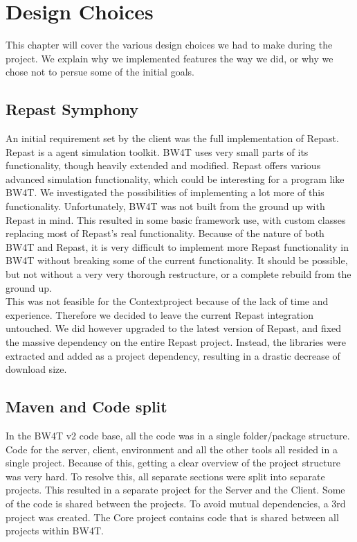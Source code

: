 \label{Design}
\chapter{Design Choices}
This chapter will cover the various design choices we had to make during the project. We explain why we implemented features the way we did, or why we chose not to persue some of the initial goals. 

\section{Repast Symphony}
An initial requirement set by the client was the full implementation of Repast. Repast is a agent simulation toolkit. BW4T uses very small parts of its functionality, though heavily extended and modified. Repast offers various advanced simulation functionality, which could be interesting for a program like BW4T. We investigated the possibilities of implementing a lot more of this functionality. Unfortunately, BW4T was not built from the ground up with Repast in mind. This resulted in some basic framework use, with custom classes replacing most of Repast's real functionality. Because of the nature of both BW4T and Repast, it is very difficult to implement more Repast functionality in BW4T without breaking some of the current functionality. It should be possible, but not without a very very thorough restructure, or a complete rebuild from the ground up. \\

This was not feasible for the Contextproject because of the lack of time and experience. Therefore we decided to leave the current Repast integration untouched. We did however upgraded to the latest version of Repast, and fixed the massive dependency on the entire Repast project. Instead, the libraries were extracted and added as a project dependency, resulting in a drastic decrease of download size. 

\section{Maven and Code split} %
In the BW4T v2 code base, all the code was in a single folder/package structure. Code for the server, client, environment and all the other tools all resided in a single project. Because of this, getting a clear overview of the project structure was very hard. To resolve this, all separate sections were split into separate projects. This resulted in a separate project for the Server and the Client. Some of the code is shared between the projects. To avoid mutual dependencies, a 3rd project was created. The Core project contains code that is shared between all projects within BW4T. 

